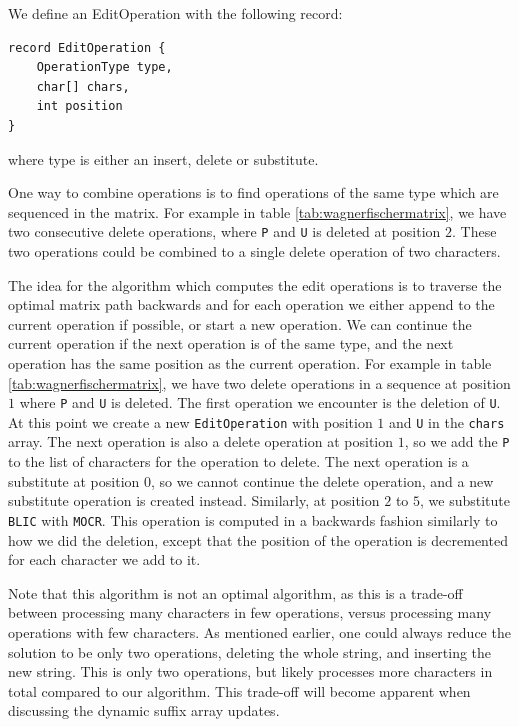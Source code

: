 We define an EditOperation with the following record:

\begin{lstlisting}
record EditOperation {
    OperationType type,
    char[] chars,
    int position
}
\end{lstlisting}

where type is either an insert, delete or substitute.

One way to combine operations is to find operations of the same type which are sequenced
in the matrix. For example in table \ref{tab:wagnerfischermatrix}, we have two consecutive
delete operations, where \verb|P| and \verb|U| is deleted at position $2$. These two
operations could be combined to a single delete operation of two characters.

The idea for the algorithm which computes the edit operations is to traverse the optimal
matrix path backwards and for each operation we either append to the current operation if
possible, or start a new operation. We can continue the current operation if the next
operation is of the same type, and the next operation has the same position as the current
operation. For example in table \ref{tab:wagnerfischermatrix}, we have two delete
operations in a sequence at position $1$ where \verb|P| and \verb|U| is deleted. The first
operation we encounter is the deletion of \verb|U|. At this point we create a new
\verb|EditOperation| with position $1$ and \verb|U| in the \verb|chars| array. The next
operation is also a delete operation at position $1$, so we add the \verb|P| to the list
of characters for the operation to delete. The next operation is a substitute at position
$0$, so we cannot continue the delete operation, and a new substitute operation is created
instead. Similarly, at position $2$ to $5$, we substitute \verb|BLIC| with \verb|MOCR|.
This operation is computed in a backwards fashion similarly to how we did the deletion,
except that the position of the operation is decremented for each character we add to it.

Note that this algorithm is not an optimal algorithm, as this is a trade-off between
processing many characters in few operations, versus processing many operations with few
characters. As mentioned earlier, one could always reduce the solution to be only two
operations, deleting the whole string, and inserting the new string. This is only two
operations, but likely processes more characters in total compared to our algorithm. This
trade-off will become apparent when discussing the dynamic suffix array updates.

